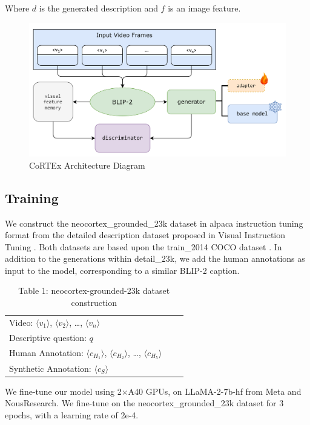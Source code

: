 \documentclass[conference]{IEEEtran}
\begin{document}
Where $d$ is the generated description and $f$ is an image feature.

\begin{figure}[H]
\centering
\includegraphics[width=\columnwidth]{cortex.png}
\caption{CoRTEx Architecture Diagram}
\label{fig:image}
\end{figure}

\subsection{Training}

We construct the neocortex\_grounded\_23k dataset in alpaca instruction tuning format from the detailed description dataset proposed in Visual Instruction Tuning \cite{liu2023visual}. Both datasets are based upon the train\_2014 COCO dataset \cite{lin2015microsoft}. In addition to the generations within detail\_23k, we add the human annotations as input to the model, corresponding to a similar BLIP-2 caption.

\begin{table}[h] %
\centering
\begin{tabular}{ |l|l|l| } 
 \hline
 Video: $\langle v_1\rangle$, $\langle v_2\rangle$, \dots, $\langle v_n\rangle$\\ 
 Descriptive question: $q$\\ 
 Human Annotation: $\langle c_{H_1}\rangle$, $\langle c_{H_2}\rangle$, \dots, $\langle c_{H_5}\rangle$\\
 Synthetic Annotation: $\langle c_S\rangle$ \\
 \hline
\end{tabular}
\caption*{Table 1: neocortex-grounded-23k dataset construction}
\end{table}

We fine-tune our model using 2$\times$A40 GPUs, on LLaMA-2-7b-hf from Meta and NousResearch. We fine-tune on the neocortex\_grounded\_23k dataset for 3 epochs, with a learning rate of 2e-4.
\end{document}
